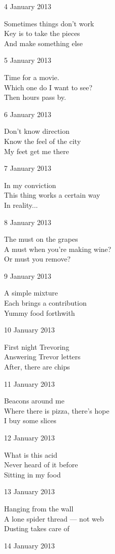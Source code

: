 \documentclass[12pt]{article}
\begin{document}
4 January 2013

Sometimes things don't work \\
Key is to take the pieces \\
And make something else

5 January 2013

Time for a movie. \\
Which one do I want to see? \\
Then hours pass by.

6 January 2013

Don't know direction \\
Know the feel of the city \\
My feet get me there

7 January 2013

In my conviction \\
This thing works a certain way \\
In reality...

8 January 2013

The must on the grapes \\
A must when you're making wine? \\
Or must you remove?

9 January 2013

A simple mixture \\
Each brings a contribution \\
Yummy food forthwith

10 January 2013

First night Trevoring \\
Answering Trevor letters \\
After, there are chips

\newpage

11 January 2013

Beacons around me \\
Where there is pizza, there's hope \\
I buy some slices

12 January 2013

What is this acid \\
Never heard of it before \\
Sitting in my food

13 January 2013

Hanging from the wall \\
A lone spider thread --- not web \\
Dusting takes care of

14 January 2013
\end{document}
